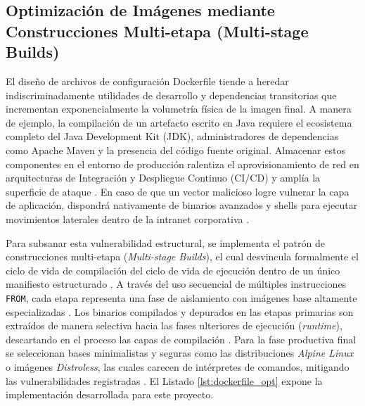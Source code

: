 \documentclass[12pt,journal,onecolumn]{IEEEtran}
\begin{document}
\subsection{\textbf{Optimización de Imágenes mediante Construcciones Multi-etapa (Multi-stage Builds)}}
El diseño de archivos de configuración Dockerfile tiende a heredar indiscriminadamente utilidades de desarrollo y dependencias transitorias que incrementan exponencialmente la volumetría física de la imagen final. A manera de ejemplo, la compilación de un artefacto escrito en Java requiere el ecosistema completo del Java Development Kit (JDK), administradores de dependencias como Apache Maven y la presencia del código fuente original. Almacenar estos componentes en el entorno de producción ralentiza el aprovisionamiento de red en arquitecturas de Integración y Despliegue Continuo (CI/CD) y amplía la superficie de ataque \cite{sultan2019}. En caso de que un vector malicioso logre vulnerar la capa de aplicación, dispondrá nativamente de binarios avanzados y shells para ejecutar movimientos laterales dentro de la intranet corporativa \cite{sultan2019}.

Para subsanar esta vulnerabilidad estructural, se implementa el patrón de construcciones multi-etapa (\textit{Multi-stage Builds}), el cual desvincula formalmente el ciclo de vida de compilación del ciclo de vida de ejecución dentro de un único manifiesto estructurado \cite{burns2025}. A través del uso secuencial de múltiples instrucciones \texttt{FROM}, cada etapa representa una fase de aislamiento con imágenes base altamente especializadas \cite{burns2025, al-asfoor2024}. Los binarios compilados y depurados en las etapas primarias son extraídos de manera selectiva hacia las fases ulteriores de ejecución (\textit{runtime}), descartando en el proceso las capas de compilación \cite{burns2025}. Para la fase productiva final se seleccionan bases minimalistas y seguras como las distribuciones \textit{Alpine Linux} o imágenes \textit{Distroless}, las cuales carecen de intérpretes de comandos, mitigando las vulnerabilidades registradas \cite{sultan2019}. El Listado \ref{lst:dockerfile_opt} expone la implementación desarrollada para este proyecto.

\newpage
\end{document}
